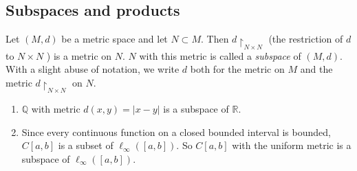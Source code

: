 \documentclass[a4paper]{article}
\begin{document}
\subsection{Subspaces and products}
\begin{definition}[Subspaces]
    Let $(M, d)$ be a metric space and let $N \subset M$. Then $d\upharpoonright_{N \times N}$ (the restriction of $d$ to $N \times N$ ) is a metric on $N$. $N$ with this metric is called a \textit{subspace} of $(M, d)$. With a slight abuse of notation, we write $d$ both for the metric on $M$ and the metric $d \upharpoonright _{N \times N}$ on $N$.
\end{definition}
\begin{example}
    \begin{enumerate}
        \item $\mathbb{Q}$ with metric $d(x, y)=|x-y|$ is a subspace of $\mathbb{R}$.
        \item Since every continuous function on a closed bounded interval is bounded, $C[a, b]$ is a subset of $\ell_{\infty}([a, b])$. So $C[a, b]$ with the uniform metric is a subspace of $\ell_{\infty}([a, b])$.
    \end{enumerate}
\end{example}
\end{document}
